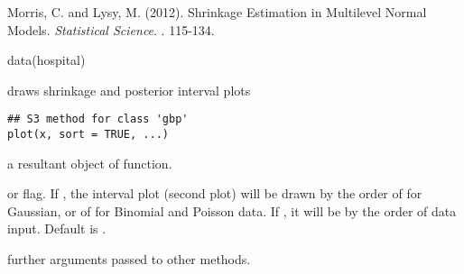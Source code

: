 \documentclass[a4paper]{book}
\begin{document}
%
\begin{Source}\relax
Morris, C. and Lysy, M. (2012). Shrinkage Estimation in Multilevel Normal Models. \emph{Statistical Science}. . 115-134.
\end{Source}
%
\begin{Examples}
\begin{ExampleCode}
  data(hospital)
\end{ExampleCode}
\end{Examples}
%
\begin{Description}\relax
{} draws shrinkage and posterior interval plots
\end{Description}
%
\begin{Usage}
\begin{verbatim}
## S3 method for class 'gbp'
plot(x, sort = TRUE, ...)
\end{verbatim}
\end{Usage}
%
\begin{Arguments}
\begin{ldescription}
\item[\code{x}] 
a resultant object of  function. 

\item[\code{sort}] 
 or  flag. If , the interval plot (second plot) will be drawn by the order of  for Gaussian, or of  for Binomial and Poisson data. If , it will be by the order of data input. Default is .

\item[\code{...}] 
further arguments passed to other methods.

\end{ldescription}
\end{Arguments}
%
\end{document}
